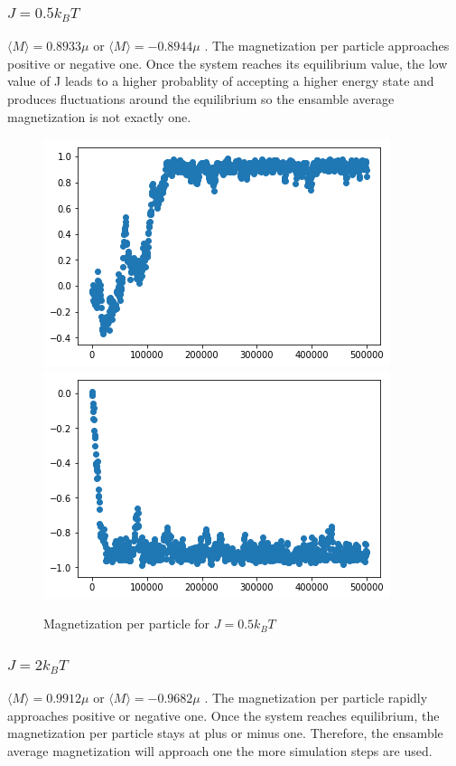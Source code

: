 \documentclass{article}
\begin{document}
	\subsubsection*{$J=0.5k_BT $}
			$\langle M \rangle = 0.8933\mu$ or $\langle M \rangle = -0.8944\mu$ . The magnetization per particle approaches positive or negative one. Once the system reaches its equilibrium value, the low value of J leads to a higher probablity of accepting a higher energy state and produces fluctuations around the equilibrium so the ensamble average magnetization is not exactly one. 

			\begin{figure}[H]
				\centering
				\includegraphics[scale=0.5]{J=05m1}
				\includegraphics[scale=0.5]{J=05m2}
				\caption{Magnetization per particle for $J=0.5k_BT$}
			\end{figure}

	\subsubsection*{$J=2k_BT $}
			$\langle M \rangle = 0.9912\mu$ or $\langle M \rangle = -0.9682\mu$ . The magnetization per particle rapidly approaches positive or negative one. Once the system reaches equilibrium, the magnetization per particle stays at plus or minus one. Therefore, the ensamble average magnetization will approach one the more simulation steps are used. 
\end{document}
